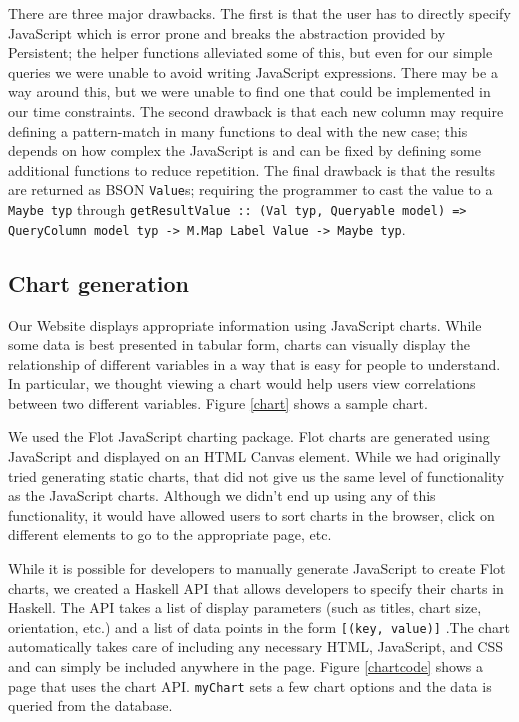 \documentclass[letterpaper,twocolumn,9pt]{article}
\newcommand{\code}[1]{\texttt{#1}}
\begin{document}
There are three major drawbacks.  The first is that the user has to directly specify JavaScript which is error prone and breaks the abstraction provided by Persistent; the helper functions alleviated some of this, but even for our simple queries we were unable to avoid writing JavaScript expressions.  There may be a way around this, but we were unable to find one that could be implemented in our time constraints.  The second drawback is that each new column may require defining a pattern-match in many functions to deal with the new case; this depends on how complex the JavaScript is and can be fixed by defining some additional functions to reduce repetition.  The final drawback is that the results are returned as BSON \code{Value}s; requiring the programmer to cast the value to a \code{Maybe typ} through \code{getResultValue :: (Val typ, Queryable model) => QueryColumn model typ -> M.Map Label Value -> Maybe typ}.

\subsection{Chart generation}

Our Website displays appropriate information using JavaScript charts. While some data is best presented in tabular form, charts can visually display the relationship of different variables in a way that is easy for people to understand. In particular, we thought viewing a chart would help users view correlations between two different variables. Figure \ref{chart} shows a sample chart.

We used the Flot JavaScript charting package. Flot charts are generated using JavaScript and displayed on an HTML Canvas element. While we had originally tried generating static charts, that did not give us the same level of functionality as the JavaScript charts. Although we didn't end up using any of this functionality, it would have allowed users to sort charts in the browser, click on different elements to go to the appropriate page, etc.

While it is possible for developers to manually generate JavaScript to create Flot charts, we created a Haskell API that allows developers to specify their charts in Haskell. The API takes a list of display parameters (such as titles, chart size, orientation, etc.) and a list of data points in the form \code{[(key, value)]} .The chart automatically takes care of including any necessary HTML, JavaScript, and CSS and can simply be included anywhere in the page. Figure \ref{chartcode} shows a page that uses the chart API. \code{myChart} sets a few chart options and the data is queried from the database.
\end{document}
